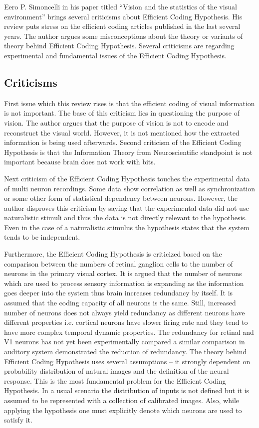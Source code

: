 \documentclass[twoside]{article}
\begin{document}
\begin{multicols}{2}
Eero P. Simoncelli in his paper titled ``Vision and the statistics of the visual environment'' brings several criticisms about Efficient Coding Hypothesis. His review puts stress on the efficient coding articles published in the last several years. The author argues some misconceptions about the theory or variants of theory behind Efficient Coding Hypothesis. Several criticisms are regarding experimental and fundamental issues of the Efficient Coding Hypothesis.

\subsection{Criticisms}

First issue which this review rises is that the efficient coding of visual information is not important. The base of this criticism lies in questioning the purpose of vision. The author argues that the purpose of vision is not to encode and reconstruct the visual world. However, it is not mentioned how the extracted information is being used afterwards. 
Second criticism of the Efficient Coding Hypothesis is that the Information Theory from Neuroscientific standpoint is not important because brain does not work with bits. 

Next criticism of the Efficient Coding Hypothesis touches the experimental data of multi neuron recordings. Some data show correlation as well as synchronization or some other form of statistical dependency between neurons.  However, the author disproves this criticism by saying that the experimental data did not use naturalistic stimuli and thus the data is not directly relevant to the hypothesis. Even in the case of a naturalistic stimulus the hypothesis states that the system tends to be independent. 

Furthermore, the Efficient Coding Hypothesis is criticized based on the comparison between the numbers of retinal ganglion cells to the number of neurons in the primary visual cortex. It is argued that the number of neurons which are used to process sensory information is expanding as the information goes deeper into the system thus brain increases redundancy by itself.  It is assumed that the coding capacity of all neurons is the same. Still, increased number of neurons does not always yield redundancy as different neurons have different properties i.e. cortical neurons have slower firing rate and they tend to have more complex temporal dynamic properties. The redundancy for retinal and V1 neurons has not yet been experimentally compared a similar comparison in auditory system demonstrated the reduction of redundancy. 
The theory behind Efficient Coding Hypothesis uses several assumptions – it strongly dependent on probability distribution of natural images and the definition of the neural response.  This is the most fundamental problem for the Efficient Coding Hypothesis. In a usual scenario the distribution of inputs is not defined but it is assumed to be represented with a collection of calibrated images. Also, while applying the hypothesis one must explicitly denote which neurons are used to satisfy it. 


\end{multicols}
\end{document}
